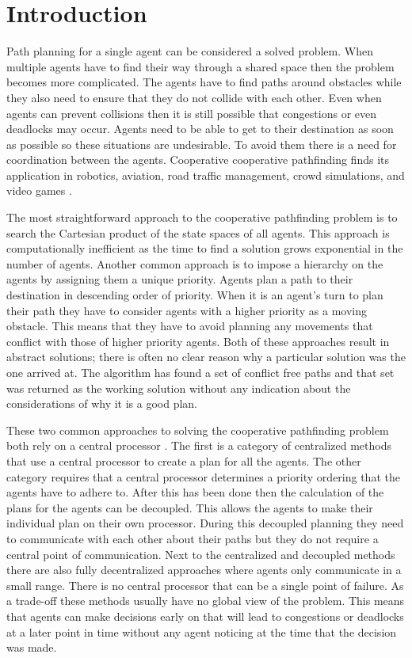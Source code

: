 \section{Introduction}\label{sec:intro}
Path planning for a single agent can be considered a solved problem.
When multiple agents have to find their way through a shared space then the
problem becomes more complicated. The agents have to find paths around
obstacles while they also need to ensure that they do not collide with each
other. Even when agents can prevent collisions then it is still possible that
congestions or even deadlocks may occur. Agents need to be able to get to their
destination as soon as possible so these situations are undesirable. To avoid
them there is a need for coordination between the agents. Cooperative
cooperative pathfinding finds its application in robotics, aviation, road
traffic management, crowd simulations, and video games \cite{standley2011}.

The most straightforward approach to the cooperative pathfinding problem
is to search the Cartesian product of the state spaces of all agents. This
approach is computationally inefficient \cite{sharon2013} as the time to find a
solution grows exponential in the number of agents. Another common approach is 
to
impose a hierarchy on the agents by assigning them a unique priority. Agents
plan a path to their destination in descending order of priority. When it is an
agent's turn to plan their path they have to consider agents with a higher
priority as a moving obstacle. This means that they have to avoid planning any
movements that conflict with those of higher priority agents. Both of these
approaches result in abstract solutions; there is often no clear reason why a
particular solution was the one arrived at. The algorithm has found a set of
conflict free paths and that set was returned as the working solution without
any indication about the considerations of why it is a good plan.

These two common approaches to solving the cooperative pathfinding problem both
rely on a central processor \cite{chouhan2017}. The first is a category of
centralized methods that use a central processor to create a plan for all the
agents. The other category requires that a central processor determines a
priority ordering that the agents have to adhere to. After this has been done
then the calculation of the plans for the agents can be decoupled. This allows
the agents to make their individual plan on their own processor. During this
decoupled planning they need to communicate with each other about their paths
but they do not require a central point of communication. Next to the
centralized and decoupled methods there are also fully decentralized approaches
where agents only communicate in a small range. There is no central processor
that can be a single point of failure. As a trade-off these methods usually
have no global view of the problem. This means that agents can make decisions
early on that will lead to congestions or deadlocks at a later point in time 
without any agent
noticing at the time that the decision was made.

